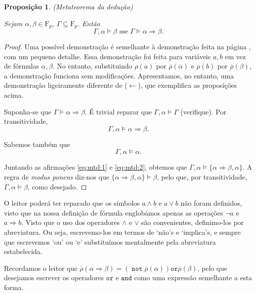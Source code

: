 \documentclass{report}
\newtheorem{prop}{Proposição}
\theoremstyle{definition}
\theoremstyle{remark}
\newcommand{\F}{\mathrm{F}}
\DeclareMathOperator{\pnot}{\texttt{not}}
\newcommand{\pand}{\mathbin{\texttt{and}}}
\newcommand{\por}{\mathbin{\texttt{or}}}
\newcommand{\imply}{\mathbin{\Rightarrow}}
\begin{document}
	\begin{prop}\label{prop:mtd}
	(Metateorema da dedução)
	
	Sejam $\alpha, \beta \in \F_p$, $\Gamma \subseteq \F_p$. Então
	\[\Gamma, \alpha \vDash \beta \text{ sse } \Gamma \vDash \alpha \imply \beta.\]
	\end{prop}
	
	\begin{proof}
	Uma possível demonstração é semelhante à demonstração feita na página \pageref{dem:mtd}, com um pequeno detalhe. Essa demonstração foi feita para variáveis $a, b$ em vez de fórmulas $\alpha, \beta$. No entanto, substituindo $\rho(a)$ por $\overline\rho(\alpha)$ e $\rho(b)$ por $\overline\rho(\beta)$, a demonstração funciona sem modificações. Apresentamos, no entanto, uma demonstração ligeiramente diferente de ($\leftarrow$), que exemplifica as proposições acima.
	
	Suponha-se que $\Gamma \vDash \alpha \imply \beta$. É trivial reparar que $\Gamma, \alpha \vDash \Gamma$ (verifique). Por transitividade,
	\begin{equation}\label{eq:mtd:1}
	\Gamma, \alpha \vDash \alpha \imply \beta.
	\end{equation}
	
	Sabemos também que
	\begin{equation}\label{eq:mtd:2}
	\Gamma, \alpha \vDash \alpha.
	\end{equation}
	
	Juntando as afirmações \eqref{eq:mtd:1} e \eqref{eq:mtd:2}, obtemos que $\Gamma, \alpha \vDash \{\alpha \imply \beta, \alpha\}$. A regra de \textit{modus ponens} diz-nos que $\{\alpha \imply \beta, \alpha\} \vDash \beta$, pelo que, por transitividade, $\Gamma, \alpha \vDash \beta$, como desejado.
	\end{proof}
	
	O leitor poderá ter reparado que os símbolos $a \land b$ e $a \lor b$ não foram definidos, visto que na nossa definição de fórmula englobámos apenas as operações $\neg a$ e $a \imply b$. Visto que o uso dos operadores $\land$ e $\lor$ são convenientes, definimo-los por abreviatura. Ou seja, escrevemo-los em termos de `não's e `implica's, e sempre que escrevemos `ou' ou `e' substituímos mentalmente pela abreviatura estabelecida.
	
	Recordamos o leitor que $\overline\rho(\alpha \imply \beta) = (\pnot \overline\rho(\alpha)) \por \overline\rho(\beta)$, pelo que desejamos escrever os operadores $\por$ e $\pand$ como uma expressão semelhante a esta forma.
	
\end{document}
